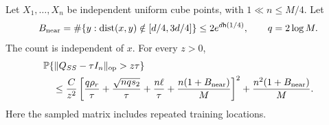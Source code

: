 \begin{lemma}\label{lem:gram-general}
Let $X_1,\ldots,X_n$ be independent uniform cube points, with
$1\ll n\le M/4$. Let
\[
 B_{\mathrm{near}}=\#\{y:\operatorname{dist}(x,y)\notin[d/4,3d/4]\}
 \le 2e^{d\mathsf h(1/4)},\qquad q=2\log M.
\]
The count is independent of $x$. For every $z>0$,
\begin{align}
 &\mathbb P\{\|Q_{SS}-\tau I_n\|_{\mathrm{op}}>z\tau\}
 \notag\\
 &\quad\le\frac C{z^2}
 \left[\frac{q\rho_r}{\tau}
       +\frac{\sqrt{nq s_2}}{\tau}
       +\frac{n\ell}{\tau}
       +\frac{n(1+B_{\mathrm{near}})}M\right]^2
       +\frac{n^2(1+B_{\mathrm{near}})}M.
 \label{eq:gram-bound}
\end{align}
Here the sampled matrix includes repeated training locations.
\end{lemma}
